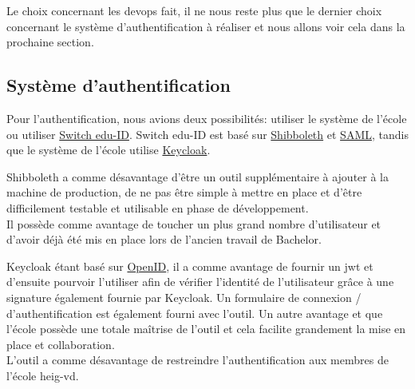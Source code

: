 \documentclass[
    iai, %
    il, %
]{heig-tb}
\begin{document}


Le choix concernant les \Gls{devops} fait, il ne nous reste plus que le dernier choix concernant le système d'authentification à réaliser et nous allons voir cela dans la prochaine section.

\subsection{Système d'authentification}
Pour l'authentification, nous avions deux possibilités: utiliser le système de l'école ou utiliser \href{https://www.switch.ch/edu-id/}{Switch edu-ID}. Switch edu-ID est basé sur \href{https://www.switch.ch/aai/about/shibboleth/}{Shibboleth} et \href{https://support.google.com/a/answer/6262987?hl=fr}{SAML}, tandis que le système de l'école utilise \href{https://www.keycloak.org/}{Keycloak}.

Shibboleth a comme désavantage d'être un outil supplémentaire à ajouter à la machine de production, de ne pas être simple à mettre en place et d'être difficilement testable et utilisable en phase de développement. \\
Il possède comme avantage de toucher un plus grand nombre d'utilisateur et d'avoir déjà été mis en place lors de l'ancien travail de Bachelor.

Keycloak étant basé sur \href{https://openid.net/connect/}{OpenID}, il a comme avantage de fournir un \Gls{jwt} et d'ensuite pourvoir l'utiliser afin de vérifier l'identité de l'utilisateur grâce à une signature également fournie par Keycloak. Un formulaire de connexion / d'authentification est également fourni avec l'outil. Un autre avantage et que l'école possède une totale maîtrise de l'outil et cela facilite grandement la mise en place et collaboration. \\
L'outil a comme désavantage de restreindre l'authentification aux membres de l'école \Gls{heig-vd}.
\end{document}
